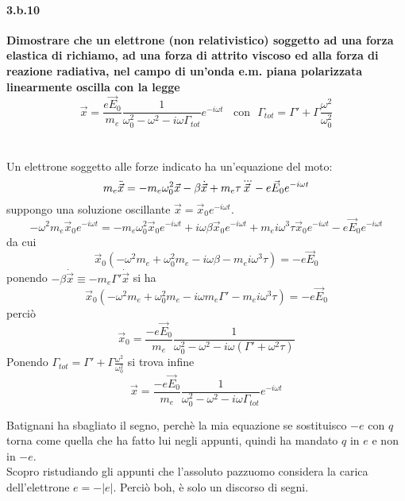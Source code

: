 \documentclass[twoside]{article}
\begin{document}
\paragraph{3.b.10}\textbf{Dimostrare che un elettrone (non relativistico) soggetto ad una forza elastica di
richiamo, ad una forza di attrito viscoso ed alla forza di reazione radiativa, nel
campo di un’onda e.m. piana polarizzata linearmente oscilla con la legge
\begin{equation*}
    \vec{x}=\frac{e\vec{E}_0}{m_e}\frac{1}{\omega_0^2-\omega^2-i\omega\Gamma_{tot}}e^{-i\omega t} \ \ \ \ \text{con} \ \ \ \Gamma_{tot}=\Gamma'+\Gamma \frac{\omega^2}{\omega_0^2}
\end{equation*}}\\ \\
Un elettrone soggetto alle forze indicato ha un'equazione del moto:
\begin{equation}
    m_e\Ddot{\vec{x}}=-m_e \omega_0 ^2\vec{x}-\beta \dot{\vec{x}}+m_e \tau \dddot{\vec{x}} -e\vec{E}_0 e^{-i\omega t} 
\end{equation}
suppongo una soluzione oscillante $\vec{x}=\vec{x}_0 e^{-i\omega t}$.
\begin{equation}
    -\omega^2 m_e \vec{x}_0 e^{-i\omega t}=-m_e \omega_0 ^2 \vec{x}_0 e^{-i\omega t}+i\omega \beta \vec{x}_0 e^{-i\omega t} + m_e i\omega^3 \tau \vec{x}_0 e^{-i\omega t}-e\vec{E}_0 e^{-i\omega t}
\end{equation}
da cui
\begin{equation}
    \vec{x}_0(-\omega^2m_e + \omega_0 ^2 m_e -i\omega \beta -m_e i \omega^3 \tau)=-e\vec{E}_0
\end{equation}
ponendo $-\beta \dot{\vec{x}}\equiv -m_e \Gamma ' \dot{\vec{x}}$ si ha
\begin{equation}
     \vec{x}_0(-\omega^2m_e + \omega_0 ^2 m_e -i\omega m_e \Gamma ' -m_e i \omega^3\tau)=-e\vec{E}_0
\end{equation}
perciò
\begin{equation}
    \vec{x}_0=\frac{-e \vec{E}_0}{m_e}\frac{1}{\omega_0 ^2 -\omega^2 -i\omega( \Gamma' +\omega^2 \tau)}
\end{equation}
Ponendo $\Gamma_{tot}=\Gamma' + \Gamma \frac{\omega^2}{\omega_0 ^2}$ si trova infine
\begin{equation}
    \vec{x}=\frac{-e \vec{E}_0}{m_e}\frac{1}{\omega_0 ^2 -\omega^2 -i\omega\Gamma_{tot}}e^{-i\omega t}
\end{equation}




Batignani ha sbagliato il segno, perchè la mia equazione se sostituisco $-e$ con $q$ torna come quella che ha fatto lui negli appunti, quindi ha mandato $q$ in $e$ e non in $-e$.
\\
Scopro ristudiando gli appunti che l'assoluto pazzuomo considera la carica dell'elettrone $e=-|e|$. Perciò boh, è solo un discorso di segni.
\end{document}
